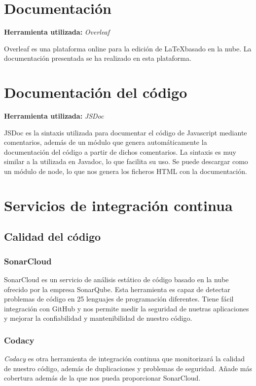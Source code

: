 \section{Documentación}
\textbf{Herramienta utilizada: }\emph{Overleaf}

Overleaf es una plataforma online para la edición de \LaTeX basado en la nube. La documentación presentada se ha realizado en esta plataforma.

\section{Documentación del código}
\textbf{Herramienta utilizada: }\emph{JSDoc}

JSDoc es la sintaxis utilizada para documentar el código de Javascript mediante comentarios, además de un módulo que genera automáticamente la documentación del código a partir de dichos comentarios. La sintaxis es muy similar a la utilizada en Javadoc, lo que facilita su uso. Se puede descargar como un módulo de node, lo que nos genera los ficheros HTML con la documentación.

\section{Servicios de integración continua}
\subsection{Calidad del código}
\subsubsection{SonarCloud}
SonarCloud es un servicio de análisis estático de código basado en la nube ofrecido por la empresa SonarQube. Esta herramienta es capaz de detectar problemas de código en 25 lenguajes de programación diferentes. Tiene fácil integración con GitHub y nos permite medir la seguridad de nuetras aplicaciones y mejorar la confiabilidad y mantenibilidad de nuestro código\cite{platzi:sonarcloud}.

\subsubsection{Codacy}
\emph{Codacy} es otra herramienta de integración continua que monitorizará la calidad de nuestro código, además de duplicaciones y problemas de seguridad. Añade más cobertura además de la que nos pueda proporcionar SonarCloud.

